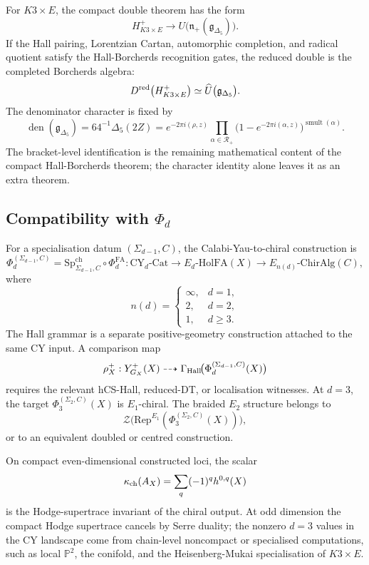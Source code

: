 For $K3 \times E$, the compact double theorem has the form
\[
  H^{+}_{K3\times E}
  \longrightarrow
  U\bigl(\mathfrak{n}_{+}(\mathfrak{g}_{\Delta_5})\bigr).
\]
If the Hall pairing, Lorentzian Cartan, automorphic completion, and
radical quotient satisfy the Hall-Borcherds recognition gates, the
reduced double is the completed Borcherds algebra:
\[
  D^{\mathrm{red}}\bigl(H^{+}_{K3\times E}\bigr)
  \simeq
  \widehat{U}\bigl(\mathfrak{g}_{\Delta_5}\bigr).
\]
The denominator character is fixed by
\[
  \operatorname{den}(\mathfrak{g}_{\Delta_5})
  =
  64^{-1}\Delta_5(2Z)
  =
  e^{-2\pi i(\rho,z)}
  \prod_{\alpha\in\mathcal{R}_{+}}
  \bigl(1-e^{-2\pi i(\alpha,z)}\bigr)^{\operatorname{smult}(\alpha)}.
\]
The bracket-level identification is the remaining mathematical content
of the compact Hall-Borcherds theorem; the character identity alone
leaves it as an extra theorem.

\subsection*{Compatibility with \texorpdfstring{$\Phi_d$}{Phi-d}}

For a specialisation datum $(\Sigma_{d-1},C)$, the
Calabi-Yau-to-chiral construction is
\[
  \Phi_d^{(\Sigma_{d-1},C)}
  =
  \mathrm{Sp}^{\mathrm{ch}}_{\Sigma_{d-1},C}\circ \Phi^{\mathrm{FA}}_d
  :
  \mathrm{CY}_{d}\text{-}\mathrm{Cat}
  \longrightarrow
  E_{d}\text{-}\mathrm{HolFA}(X)
  \longrightarrow
  E_{n(d)}\text{-}\mathrm{ChirAlg}(C),
\]
where
\[
  n(d)=
  \begin{cases}
    \infty, & d=1,\\
    2, & d=2,\\
    1, & d\geq 3.
  \end{cases}
\]
The Hall grammar is a separate positive-geometry construction attached
to the same CY input.  A comparison map
\[
  \rho_X^{+}:
  Y^{+}_{G_X}(X)
  \dashrightarrow
  \Gamma_{\mathrm{Hall}}\!
  \bigl(\Phi_d^{(\Sigma_{d-1},C)}(X)\bigr)
\]
requires the relevant hCS-Hall, reduced-DT, or localisation witnesses.
At $d=3$, the target
$\Phi_3^{(\Sigma_2,C)}(X)$ is $E_{1}$-chiral.  The braided
$E_{2}$ structure belongs to
\[
  \mathcal{Z}
  \bigl(\mathrm{Rep}^{E_1}
  (\Phi_3^{(\Sigma_2,C)}(X))\bigr),
\]
or to an equivalent doubled or centred construction.

On compact even-dimensional constructed loci, the scalar
\[
  \kappa_{\mathrm{ch}}(A_X)=\sum_q (-1)^q h^{0,q}(X)
\]
is the Hodge-supertrace invariant of the chiral output.  At odd
dimension the compact Hodge supertrace cancels by Serre duality; the
nonzero $d=3$ values in the CY landscape come from chain-level
noncompact or specialised computations, such as local $\mathbb{P}^{2}$,
the conifold, and the Heisenberg-Mukai specialisation of $K3\times E$.
